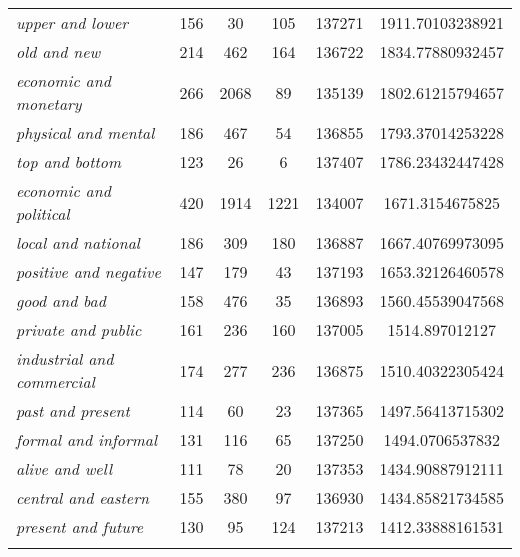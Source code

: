 \begin{table}[!htbp]
{\begin{tabular}[t]{l *{4}{S[table-format=5]} S}
\textit{upper and lower} & 156 & 30 & 105 & 137271 & 1911.70103238921 \\
\textit{old and new} & 214 & 462 & 164 & 136722 & 1834.77880932457 \\
\textit{economic and monetary} & 266 & 2068 & 89 & 135139 & 1802.61215794657 \\
\textit{physical and mental} & 186 & 467 & 54 & 136855 & 1793.37014253228 \\
\textit{top and bottom} & 123 & 26 & 6 & 137407 & 1786.23432447428 \\
\textit{economic and political} & 420 & 1914 & 1221 & 134007 & 1671.3154675825 \\
\textit{local and national} & 186 & 309 & 180 & 136887 & 1667.40769973095 \\
\textit{positive and negative} & 147 & 179 & 43 & 137193 & 1653.32126460578 \\
\textit{good and bad} & 158 & 476 & 35 & 136893 & 1560.45539047568 \\
\textit{private and public} & 161 & 236 & 160 & 137005 & 1514.897012127 \\
\textit{industrial and commercial} & 174 & 277 & 236 & 136875 & 1510.40322305424 \\
\textit{past and present} & 114 & 60 & 23 & 137365 & 1497.56413715302 \\
\textit{formal and informal} & 131 & 116 & 65 & 137250 & 1494.0706537832 \\
\textit{alive and well} & 111 & 78 & 20 & 137353 & 1434.90887912111 \\
\textit{central and eastern} & 155 & 380 & 97 & 136930 & 1434.85821734585 \\
\textit{present and future} & 130 & 95 & 124 & 137213 & 1412.33888161531 \\
\lspbottomrule
\end{tabular}}
\end{table}

